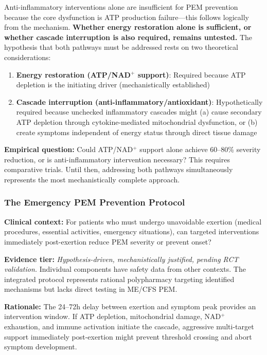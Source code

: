 \begin{keypoint}
Anti-inflammatory interventions alone are insufficient for PEM prevention because the core dysfunction is ATP production failure---this follows logically from the mechanism. \textbf{Whether energy restoration alone is sufficient, or whether cascade interruption is also required, remains untested.} The hypothesis that both pathways must be addressed rests on two theoretical considerations:
\begin{enumerate}
    \item \textbf{Energy restoration (ATP/NAD$^+$ support)}: Required because ATP depletion is the initiating driver (mechanistically established)
    \item \textbf{Cascade interruption (anti-inflammatory/antioxidant)}: Hypothetically required because unchecked inflammatory cascades might (a) cause secondary ATP depletion through cytokine-mediated mitochondrial dysfunction, or (b) create symptoms independent of energy status through direct tissue damage
\end{enumerate}
\textbf{Empirical question:} Could ATP/NAD$^+$ support alone achieve 60--80\% severity reduction, or is anti-inflammatory intervention necessary? This requires comparative trials. Until then, addressing both pathways simultaneously represents the most mechanistically complete approach.
\end{keypoint}

\subsubsection{The Emergency PEM Prevention Protocol}
\label{subsubsec:emergency-pem-protocol}

\textbf{Clinical context:} For patients who must undergo unavoidable exertion (medical procedures, essential activities, emergency situations), can targeted interventions immediately post-exertion reduce PEM severity or prevent onset?

\textbf{Evidence tier:} \textit{Hypothesis-driven, mechanistically justified, pending RCT validation.} Individual components have safety data from other contexts. The integrated protocol represents rational polypharmacy targeting identified mechanisms but lacks direct testing in ME/CFS PEM.

\textbf{Rationale:} The 24--72h delay between exertion and symptom peak provides an intervention window. If ATP depletion, mitochondrial damage, NAD$^+$ exhaustion, and immune activation initiate the cascade, aggressive multi-target support immediately post-exertion might prevent threshold crossing and abort symptom development.

